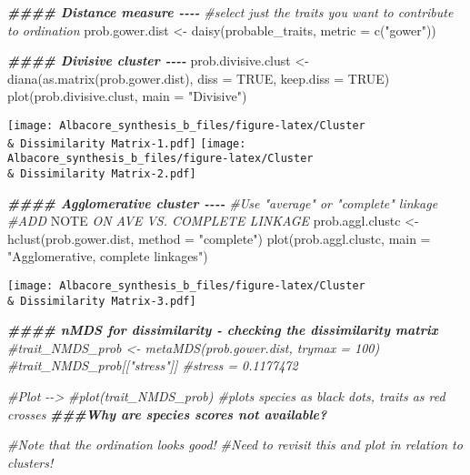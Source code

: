 \documentclass[
]{article}
\newenvironment{Shaded}{\begin{snugshade}}{\end{snugshade}}
\newcommand{\AlertTok}[1]{\textcolor[rgb]{0.94,0.16,0.16}{#1}}
\newcommand{\AttributeTok}[1]{\textcolor[rgb]{0.77,0.63,0.00}{#1}}
\newcommand{\CommentTok}[1]{\textcolor[rgb]{0.56,0.35,0.01}{\textit{#1}}}
\newcommand{\ConstantTok}[1]{\textcolor[rgb]{0.00,0.00,0.00}{#1}}
\newcommand{\DocumentationTok}[1]{\textcolor[rgb]{0.56,0.35,0.01}{\textbf{\textit{#1}}}}
\newcommand{\FunctionTok}[1]{\textcolor[rgb]{0.00,0.00,0.00}{#1}}
\newcommand{\NormalTok}[1]{#1}
\newcommand{\OtherTok}[1]{\textcolor[rgb]{0.56,0.35,0.01}{#1}}
\newcommand{\StringTok}[1]{\textcolor[rgb]{0.31,0.60,0.02}{#1}}
\begin{document}
\begin{Shaded}
\begin{Highlighting}[]
\DocumentationTok{\#\#\#\# Distance measure {-}{-}{-}{-}}
\CommentTok{\#select just the traits you want to contribute to ordination}
\NormalTok{prob.gower.dist }\OtherTok{\textless{}{-}} \FunctionTok{daisy}\NormalTok{(probable\_traits, }\AttributeTok{metric =} \FunctionTok{c}\NormalTok{(}\StringTok{"gower"}\NormalTok{))}

\DocumentationTok{\#\#\#\# Divisive cluster {-}{-}{-}{-}}
\NormalTok{prob.divisive.clust }\OtherTok{\textless{}{-}} \FunctionTok{diana}\NormalTok{(}\FunctionTok{as.matrix}\NormalTok{(prob.gower.dist), }
                              \AttributeTok{diss =} \ConstantTok{TRUE}\NormalTok{, }\AttributeTok{keep.diss =} \ConstantTok{TRUE}\NormalTok{)}
\FunctionTok{plot}\NormalTok{(prob.divisive.clust, }\AttributeTok{main =} \StringTok{"Divisive"}\NormalTok{)}
\end{Highlighting}
\end{Shaded}

\texttt{[image: Albacore\_synthesis\_b\_files/figure-latex/Cluster \\\& Dissimilarity Matrix-1.pdf]}
\texttt{[image: Albacore\_synthesis\_b\_files/figure-latex/Cluster \\\& Dissimilarity Matrix-2.pdf]}

\begin{Shaded}
\begin{Highlighting}[]
\DocumentationTok{\#\#\#\# Agglomerative cluster {-}{-}{-}{-}}
\CommentTok{\#Use "average" or "complete" linkage}
\CommentTok{\#ADD }\AlertTok{NOTE}\CommentTok{ ON AVE VS. COMPLETE LINKAGE}
\NormalTok{prob.aggl.clustc }\OtherTok{\textless{}{-}} \FunctionTok{hclust}\NormalTok{(prob.gower.dist, }\AttributeTok{method =} \StringTok{"complete"}\NormalTok{)}
\FunctionTok{plot}\NormalTok{(prob.aggl.clustc, }\AttributeTok{main =} \StringTok{"Agglomerative, complete linkages"}\NormalTok{)}
\end{Highlighting}
\end{Shaded}

\texttt{[image: Albacore\_synthesis\_b\_files/figure-latex/Cluster \\\& Dissimilarity Matrix-3.pdf]}

\begin{Shaded}
\begin{Highlighting}[]
\DocumentationTok{\#\#\#\# nMDS for dissimilarity {-} checking the dissimilarity matrix}
\CommentTok{\#trait\_NMDS\_prob \textless{}{-} metaMDS(prob.gower.dist, trymax = 100)}
\CommentTok{\#trait\_NMDS\_prob[["stress"]] \#stress = 0.1177472}

\CommentTok{\#Plot {-}{-}\textgreater{} }
\CommentTok{\#plot(trait\_NMDS\_prob) \#plots species as black dots, traits as red crosses }
\DocumentationTok{\#\#\#Why are species scores not available?}

\CommentTok{\#Note that the ordination looks good!}
\CommentTok{\#Need to revisit this and plot in relation to clusters!}
\end{Highlighting}
\end{Shaded}
\end{document}
